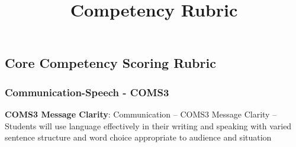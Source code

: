 \documentclass[
]{article}
\title{Competency Rubric}
\author{}
\date{\vspace{-2.5em}}
\begin{document}
\maketitle

\hypertarget{core-competency-scoring-rubric}{%
\subsection{Core Competency Scoring
Rubric}\label{core-competency-scoring-rubric}}

\hypertarget{communication-speech---coms3}{%
\subsubsection{Communication-Speech -
COMS3}\label{communication-speech---coms3}}

\textbf{COMS3 Message Clarity}: Communication -- COMS3 Message Clarity
-- Students will use language effectively in their writing and speaking
with varied sentence structure and word choice appropriate to audience
and situation
\end{document}
